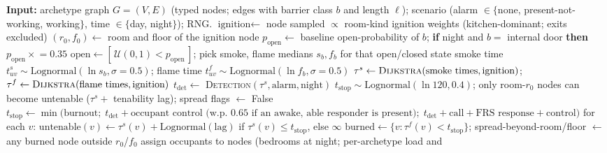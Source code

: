 \begin{algorithm}[htbp]
\caption{One iteration of the building fire--outcome simulator (one ignition).}
\label{alg:sim}
\small
\begin{algorithmic}[1]
\State \textbf{Input:} archetype graph $G=(V,E)$ (typed nodes; edges with barrier
class $b$ and length $\ell$); scenario (alarm $\in\{$none, present-not-working,
working$\}$, time $\in\{$day, night$\}$); RNG.
\State $\text{ignition} \gets$ node sampled $\propto$ room-kind ignition weights
(kitchen-dominant; exits excluded) 
\State $(r_0,f_0) \gets$ room and floor of the ignition node
  \State $p_{\text{open}} \gets$ baseline open-probability of $b$;
  \textbf{if} night and $b=$ internal door \textbf{then} $p_{\text{open}}
  \mathrel{\times}= 0.35$
  \State $\text{open} \gets [\,\mathcal{U}(0,1) < p_{\text{open}}\,]$; pick smoke,
  flame medians $s_b,f_b$ for that open/closed state
  \State smoke time $t^s_{uv}\!\sim\!\mathrm{Lognormal}(\ln s_b,\sigma{=}0.5)$;
  flame time $t^f_{uv}\!\sim\!\mathrm{Lognormal}(\ln f_b,\sigma{=}0.5)$
\EndFor
\State $\tau^s \gets \textsc{Dijkstra}(\text{smoke times},\text{ignition})$;\;
$\tau^f \gets \textsc{Dijkstra}(\text{flame times},\text{ignition})$
\State $t_{\text{det}} \gets$ \textsc{Detection}$(\tau^s,\text{alarm},\text{night})$
 
  \State $t_{\text{stop}} \sim \mathrm{Lognormal}(\ln 120,0.4)$; only room-$r_0$
  nodes can become untenable ($\tau^s{+}$ tenability lag); spread flags $\gets$ False
\Else {}
  \State $t_{\text{stop}} \gets \min\big(\text{burnout};\;
  t_{\text{det}}{+}\text{occupant control (w.p.\ } 0.65
  \text{ if an awake, able responder is present)};\;
  t_{\text{det}}{+}\text{call}{+}\text{FRS response}{+}\text{control}\big)$
  \State for each $v$: $\text{untenable}(v) \gets \tau^s(v) +
  \mathrm{Lognormal}(\text{lag})$ if $\tau^s(v)\le t_{\text{stop}}$, else $\infty$
  \State $\text{burned} \gets \{v : \tau^f(v) < t_{\text{stop}}\}$;\;
  spread-beyond-room/floor $\gets$ any burned node outside $r_0$/$f_0$
\EndIf
\State assign occupants to nodes (bedrooms at night; per-archetype load and

\end{algorithmic}
\end{algorithm}
